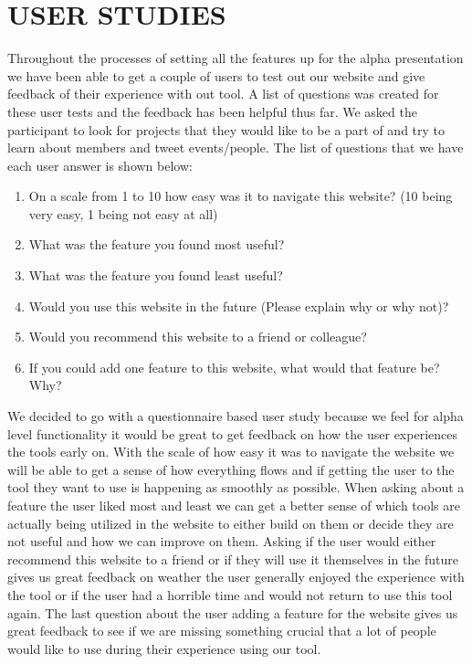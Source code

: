 \documentclass[letterpaper,10pt,onecolumn]{IEEEtran} %
\begin{document}
\section{USER STUDIES}
Throughout the processes of setting all the features up for the alpha presentation we have been able to get a couple of users to test out our website and give feedback of their experience with out tool. A list of questions was created for these user tests and the feedback has been helpful thus far. We asked the participant to look for projects that they would like to be a part of and try to learn about members and tweet events/people. The list of questions that we have each user answer is shown below: \\

\begin{enumerate}
\item On a scale from 1 to 10 how easy was it to navigate this website? (10 being very easy, 1 being not easy at all)
\item What was the feature you found most useful?
\item What was the feature you found least useful?
\item Would you use this website in the future (Please explain why or why not)?
\item Would you recommend this website to a friend or colleague?
\item If you could add one feature to this website, what would that feature be? Why? \\
\end{enumerate}

We decided to go with a questionnaire based user study because we feel for alpha level functionality it would be great to get feedback on how the user experiences the tools early on. With the scale of how easy it was to navigate the website we will be able to get a sense of how everything flows and if getting the user to the tool they want to use is happening as smoothly as possible. When asking about a feature the user liked most and least we can get a better sense of which tools are actually being utilized in the website to either build on them or decide they are not useful and how we can improve on them. Asking if the user would either recommend this website to a friend or if they will use it themselves in the future gives us great feedback on weather the user generally enjoyed the experience with the tool or if the user had a horrible time and would not return to use this tool again. The last question about the user adding a feature for the website gives us great feedback to see if we are missing something crucial that a lot of people would like to use during their experience using our tool.
\end{document}
